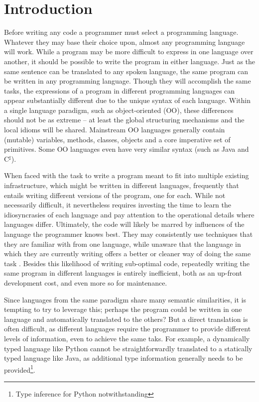 \documentclass[sigplan,review,anonymous,prologue,dvipsnames]{acmart}
\newcommand{\Csharp}{C$^{\sharp}$}
\begin{document}
\section{Introduction}

Before writing any code a programmer must select a programming
language. Whatever they may base their choice upon, almost any
programming language will work. While a program may be more difficult to
express in one language over another, it should be possible to write
the program in either language. Just as the same sentence can be translated to
any spoken language, the same program can be written in any programming
language. Though they will accomplish the same tasks, the
expressions of a program in different programming languages can appear
substantially different due to the unique syntax of each language. Within a
single language paradigm, such as object-oriented (OO),
these differences should not be as extreme -- at least the global structuring
mechanisms and the local idioms will be shared.  Mainstream OO languages
generally contain (mutable) variables, methods, classes, objects and a core
imperative set of primitives. Some OO languages even have very similar syntax
(such as Java and \Csharp).

When faced with the task to write a program meant to fit into multiple existing
infrastructure, which might be written in different languages, frequently that
entails writing different versions of the program, one for each. While not
necessarily difficult, it nevertheless
requires investing the time to learn the idiosyncrasies of each language and
pay attention to the operational details where languages differ. Ultimately,
the code will likely be marred by influences of the language the programmer
knows best. They may consistently use techniques that they are familiar with
from one language, while unaware that the language in which they are currently
writing offers a better or cleaner way of doing the same task
\cite{scholtz1990learning, alexandron2012effect}. Besides this
likelihood of writing sub-optimal code, repeatedly writing the same program in
different languages is entirely inefficient, both as an up-front development cost,
and even more so for maintenance.

Since languages from the same paradigm share many semantic similarities,
it is tempting to try to leverage this; perhaps the program could be written in
one language and
automatically translated to the others?  But a direct translation is often
difficult, as different languages require the programmer to provide different
levels of information, even to achieve the same taks.  For example, a dynamically
typed language like Python
cannot be straightforwardly translated to a statically typed
language like Java, as additional type information generally needs to be
provided\footnote{Type inference for Python notwithstanding}.
\end{document}

